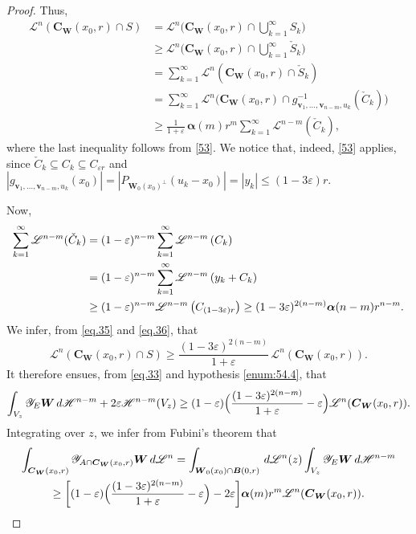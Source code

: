 \documentclass[JEP,XML,SOM,Unicode,ThmDefs,NoEqCountersInSection]{cedram}
\newcommand{\calH}{\mathscr{H}}
\newcommand{\calL}{\mathscr{L}}
\newcommand{\calY}{\mathscr{Y}}
\newcommand{\balpha}{\boldsymbol{\alpha}}
\newcommand{\bB}{{\boldsymbol{B}}}
\newcommand{\bC}{{\boldsymbol{C}}}
\newcommand{\bW}{{\boldsymbol{W}}}
\newcommand{\bv}{{\boldsymbol{v}}}
\let\veps\varepsilon
\let\subset\subseteq
\begin{document}
\begin{proof}
Thus,
\begin{equation}
\label{eq.35}
\begin{split}
\calL^n \left(\bC_\bW(x_0,r) \cap S\right) & =\calL^n \bigl(\bC_\bW(x_0,r) \cap \textstyle\bigcup_{k=1}^\infty S_k\bigr) \\
& \geq \calL^n \bigl(\bC_\bW(x_0,r) \cap \textstyle\bigcup_{k=1}^\infty \check{S}_k\bigr) \\
& = \sum_{k=1}^\infty \calL^n \left(\bC_\bW(x_0,r) \cap \check{S}_k\right) \\
& = \sum_{k=1}^\infty \calL^n \bigl(\bC_\bW(x_0,r) \cap g_{\bv_1,\ldots,\bv_{n-m},u_k}^{-1}(\check{C}_k) \bigr) \\
& \geq \frac{1}{1+\veps}\,\balpha(m)r^m \sum_{k=1}^\infty \calL^{n-m}(\check{C}_k),
\end{split}
\end{equation}
where the last inequality follows from \ref{53}.
We notice that, indeed, \ref{53} applies, since $\check{C}_k \subset C_k \subset C_{\veps r}$ and $\left|g_{\bv_1,\ldots,\bv_{n-m},u_k}(x_0)\right| = \left| P_{\bW_0(x_0)^\perp}(u_k-x_0) \right| = \left| y_k\right| \leq (1-3\veps)r$.
\par
Now,
\begin{align}
\sum_{k=1}^\infty \calL^{n-m} (\check{C}_k) &= (1-\veps)^{n-m} \sum_{k=1}^\infty \calL^{n-m} \left(C_k \right)\notag\\
&= (1-\veps)^{n-m} \sum_{k=1}^\infty \calL^{n-m} \left(y_k + C_k \right)\label{eq.36} \\
&\geq (1-\veps)^{n-m} \calL^{n-m} \left(C_{(1-3\veps)r} \right) \geq (1-3\veps)^{2(n-m)} \balpha(n-m)r^{n-m}.\notag
\end{align}
We infer, from \eqref{eq.35} and \eqref{eq.36}, that
\begin{equation*}
\calL^n \left(\bC_\bW(x_0,r) \cap S\right) \geq \frac{(1-3\veps)^{2(n-m)}}{1+\veps}\,\calL^n (\bC_\bW(x_0,r)).
\end{equation*}
It therefore ensues, from \eqref{eq.33} and hypothesis \eqref{enum:54.4}, that
\begin{equation*}
\int_{V_z} \calY_E \bW \,d\calH^{n-m} +2\veps \calH^{n-m}(V_z) \geq (1-\veps)\Bigl(\frac{(1-3\veps)^{2(n-m)}}{1+\veps} - \veps \Bigr)\calL^n(\bC_\bW(x_0,r)).
\end{equation*}
Integrating over $z$, we infer from Fubini's theorem that
\begin{multline*}
\int_{\bC_\bW(x_0,r)} \calY_{A \cap \bC_\bW(x_0,r)} \bW \,d\calL^n = \int_{\bW_0(x_0) \cap \bB(0,r)} \,d\calL^n(z) \int_{V_z} \calY_E \bW \,d\calH^{n-m} \\
\geq \biggl[ (1-\veps)\Bigl(\frac{(1-3\veps)^{2(n-m)}}{1+\veps}-\veps\Bigr)-2\veps\biggr]\balpha(m)r^m\calL^n(\bC_\bW(x_0,r)).\qedhere
\end{multline*}
\end{proof}
\end{document}
